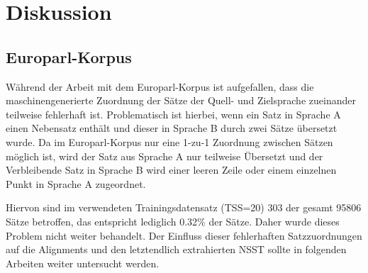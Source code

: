 \documentclass[conference]{IEEEtran}
\begin{document}


\section{Diskussion}
\subsection{Europarl-Korpus}
\label{korpusprobleme}
Während der Arbeit mit dem Europarl-Korpus ist aufgefallen, dass die maschinengenerierte Zuordnung der Sätze der Quell- und Zielsprache zueinander teilweise fehlerhaft ist.
Problematisch ist hierbei, wenn ein Satz in Sprache A einen Nebensatz enthält und dieser in Sprache B durch zwei Sätze übersetzt wurde.
Da im Europarl-Korpus nur eine 1-zu-1 Zuordnung zwischen Sätzen möglich ist, wird der Satz aus Sprache A nur teilweise Übersetzt und der Verbleibende Satz in Sprache B wird einer leeren Zeile oder einem einzelnen Punkt in Sprache A zugeordnet.

Hiervon sind im verwendeten Trainingsdatensatz (TSS=20) 303 der gesamt 95806 Sätze betroffen, das entspricht lediglich 0.32\% der Sätze. 
Daher wurde dieses Problem nicht weiter behandelt. 
Der Einfluss dieser fehlerhaften Satzzuordnungen auf die Alignments und den letztendlich extrahierten NSST sollte in folgenden Arbeiten weiter untersucht werden.
\end{document}
